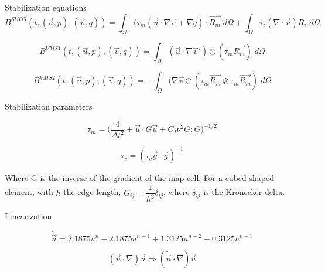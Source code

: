 \begin{frame}{Stabilization equations}
\begin{equation}
B^{SUPG}(t, (\Vec{u},p), (\Vec{v},q))  =     \int_\Omega(\tau_m(\Vec{u}\cdot\nabla \Vec{v} +\nabla q)\cdot\Vec{R_m} \;d\Omega+ \int_\Omega \tau_c (\nabla \cdot \Vec{v})R_c \;d\Omega
\label{equ:bsupg}
\end{equation}

\begin{equation}
B^{VMS1}(t, (\Vec{u},p), (\Vec{v},q))  = \int_\Omega (\Vec{u}\cdot\nabla \Vec{v}')\odot(\tau_m \Vec{R_m}) \;d\Omega
\label{equ:bvms1}
\end{equation}


\begin{equation}
B^{VMS2}(t, (\Vec{u},p), (\Vec{v},q))  = -\int_\Omega (\nabla\Vec{v}\odot(\tau_m \Vec{R_m} \otimes \tau_m \Vec{R_m}) \;d\Omega
\label{equ:bvms2}
\end{equation}

\end{frame}


\begin{frame}{Stabilization parameters}

\begin{equation}
\tau_m =\bigg( \dfrac{4}{\Delta t^2} + \Vec{u}\cdot{G}\Vec{u} + C_I \nu^2 {G}:{G} \bigg)^{-1/2}
\label{equ:taum}
\end{equation}

\begin{equation}
\tau_c = (\tau_c\Vec{g}\cdot\Vec{g})^{-1}
\label{equ:tauc}
\end{equation}

Where G is the inverse of the gradient of the map cell.
For a cubed shaped element, with $h$ the edge length, $G_{ij} =\dfrac{1}{h^2}\delta_{ij}$, where $\delta_{ij}$ is the Kronecker delta.

\end{frame}


\begin{frame}{Linearization}

\begin{equation}
    \tilde{\Vec{u}} = 2.1875 u^{n} - 2.1875 u^{n-1} + 1.3125 u^{n-2} - 0.3125 u^{n-3} 
    \label{equlin:taylor_exp}
\end{equation}

\begin{equation}
 (\Vec{u}\cdot\nabla)\Vec{u} \Rightarrow  (\tilde{\Vec{u}} \cdot\nabla)\Vec{u} 
\end{equation}


\end{frame}



